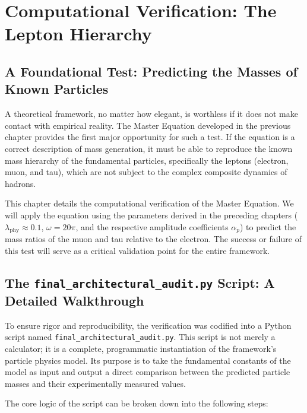 \documentclass[12pt]{report}
\begin{document}
\chapter{Computational Verification: The Lepton Hierarchy}

\section{A Foundational Test: Predicting the Masses of Known Particles}
A theoretical framework, no matter how elegant, is worthless if it does not make contact with empirical reality. The Master Equation developed in the previous chapter provides the first major opportunity for such a test. If the equation is a correct description of mass generation, it must be able to reproduce the known mass hierarchy of the fundamental particles, specifically the leptons (electron, muon, and tau), which are not subject to the complex composite dynamics of hadrons.

This chapter details the computational verification of the Master Equation. We will apply the equation using the parameters derived in the preceding chapters ($\lambda_{\text{phy}} \approx 0.1$, $\omega = 20\pi$, and the respective amplitude coefficients $\alpha_p$) to predict the mass ratios of the muon and tau relative to the electron. The success or failure of this test will serve as a critical validation point for the entire framework.

\section{The \texttt{final\_architectural\_audit.py} Script: A Detailed Walkthrough}
To ensure rigor and reproducibility, the verification was codified into a Python script named \texttt{final\_architectural\_audit.py}. This script is not merely a calculator; it is a complete, programmatic instantiation of the framework's particle physics model. Its purpose is to take the fundamental constants of the model as input and output a direct comparison between the predicted particle masses and their experimentally measured values.

The core logic of the script can be broken down into the following steps:
\end{document}
